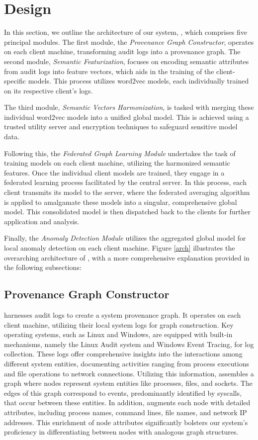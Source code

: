 \section{\Sys Design}
\label{sec:methodology}

In this section, we outline the architecture of our system, \Sys, which comprises five principal modules. The first module, the \textit{Provenance Graph Constructor}, operates on each client machine, transforming audit logs into a provenance graph. The second module, \textit{Semantic Featurization}, focuses on encoding semantic attributes from audit logs into feature vectors, which aids in the training of the client-specific \gnnshort models. This process utilizes word2vec models, each individually trained on its respective client's logs.

The third module, \textit{Semantic Vectors Harmonization}, is tasked with merging these individual word2vec models into a unified global model. This is achieved using a trusted utility server and encryption techniques to safeguard sensitive model data. 

Following this, the \textit{Federated Graph Learning Module} undertakes the task of training \gnnshort models on each client machine, utilizing the harmonized semantic features. Once the individual client models are trained, they engage in a federated learning process facilitated by the central server. In this process, each client transmits its model to the server, where the federated averaging algorithm is applied to amalgamate these models into a singular, comprehensive global model. This consolidated model is then dispatched back to the clients for further application and analysis.

Finally, the \textit{Anomaly Detection Module} utilizes the aggregated global model for local anomaly detection on each client machine. Figure \ref{arch} illustrates the overarching architecture of \Sys, with a more comprehensive explanation provided in the following subsections:

\subsection{Provenance Graph Constructor} 
\Sys harnesses audit logs to create a system provenance graph. It operates on each client machine, utilizing their local system logs for graph construction. Key operating systems, such as Linux and Windows, are equipped with built-in mechanisms, namely the Linux Audit system and Windows Event Tracing, for log collection. These logs offer comprehensive insights into the interactions among different system entities, documenting activities ranging from process executions and file operations to network connections. Utilizing this information, \Sys assembles a graph where nodes represent system entities like processes, files, and sockets. The edges of this graph correspond to events, predominantly identified by syscalls, that occur between these entities. In addition, \Sys augments each node with detailed attributes, including process names, command lines, file names, and network IP addresses. This enrichment of node attributes significantly bolsters our system's proficiency in differentiating between nodes with analogous graph structures.

